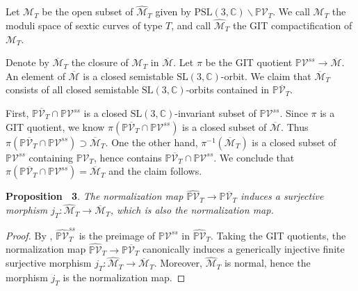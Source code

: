 \documentclass[
]{article}
\begin{document}
Let \(\mathcal{M}_T\) be the open subset of \(\widehat{\mathcal{M}}_T\)
given by
\(\mathrm{PSL}(3, \mathbb{C})\backslash \mathbb{P}\mathcal{V}_T\). We
call \(\mathcal{M}_T\) the moduli space of sextic curves of type \(T\),
and call \(\widehat{\mathcal{M}}_T\) the GIT compactification of
\(\mathcal{M}_T\).

Denote by \(\overline{\mathcal{M}}_T\) the closure of \(\mathcal{M}_T\)
in \(\overline{\mathcal{M}}\). Let \(\pi\) be the GIT quotient
\(\mathbb{P}\mathcal{V}^{ss} \to \overline{\mathcal{M}}\). An element of
\(\overline{\mathcal{M}}\) is a closed semistable
\(\mathrm{SL}(3, \mathbb{C})\)-orbit. We claim that
\(\overline{\mathcal{M}}_T\) consists of all closed semistable
\(\mathrm{SL}(3,\mathbb{C})\)-orbits contained in
\(\mathbb{P}\overline{\mathcal{V}}_T\).

First,
\(\mathbb{P}\overline{\mathcal{V}}_T \cap \mathbb{P}\mathcal{V}^{ss}\)
is a closed \(\mathrm{SL}(3,\mathbb{C})\)-invariant subset of
\(\mathbb{P}\mathcal{V}^{ss}\). Since \(\pi\) is a GIT quotient, we know
\(\pi(\mathbb{P}\overline{\mathcal{V}}_T \cap \mathbb{P}\mathcal{V}^{ss})\)
is a closed subset of \(\overline{\mathcal{M}}\). Thus
\(\pi(\mathbb{P}\overline{\mathcal{V}}_T \cap \mathbb{P}\mathcal{V}^{ss})\supset\overline{\mathcal{M}}_T\).
One the other hand, \(\pi^{-1}(\overline{\mathcal{M}}_T)\) is a closed
subset of \(\mathbb{P}\mathcal{V}^{ss}\) containing
\(\mathbb{P}\mathcal{V}_T\), hence contains
\(\mathbb{P}\overline{\mathcal{V}}_T \cap \mathbb{P}\mathcal{V}^{ss}\).
We conclude that
\(\pi(\mathbb{P}\overline{\mathcal{V}}_T \cap \mathbb{P}\mathcal{V}^{ss})=\overline{\mathcal{M}}_T\)
and the claim follows.

\textbf{Proposition~ 3}. \emph{\label{prop: M_T M^bar normalization} The
normalization map
\(\widehat{\mathbb{P}\mathcal{V}}_T \to \mathbb{P}\overline{\mathcal{V}}_T\)
induces a surjective morphism
\(j_T\colon \widehat{\mathcal{M}}_T\to \overline{\mathcal{M}}_T\), which
is also the normalization map.}

\emph{Proof.} By \cite[Theorem 1.19]{mumford1994geometric},
\(\widehat{\mathbb{P}\mathcal{V}}_T^{ss}\) is the preimage of
\(\mathbb{P}\mathcal{V}^{ss}\) in \(\widehat{\mathbb{P}\mathcal{V}}_T\).
Taking the GIT quotients, the normalization map
\(\widehat{\mathbb{P}\mathcal{V}}_T \to \mathbb{P}\overline{\mathcal{V}}_T\)
canonically induces a generically injective finite surjective morphism
\(j_T\colon\widehat{\mathcal{M}}_T \to \overline{\mathcal{M}}_T\).
Moreover, \(\widehat{\mathcal{M}}_T\) is normal, hence the morphism
\(j_T\) is the normalization map.~◻
\end{document}
